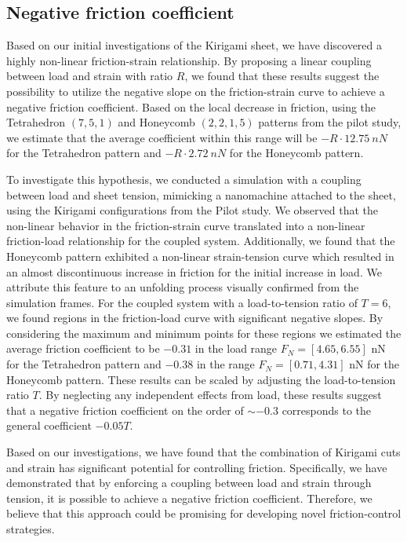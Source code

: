 \subsection{Negative friction coefficient}
Based on our initial investigations of the Kirigami sheet, we have discovered a
highly non-linear friction-strain relationship. By proposing a linear coupling
between load and strain with ratio $R$, we found that these results suggest the
possibility to utilize the negative slope on the friction-strain curve to
achieve a negative friction coefficient. Based on the local decrease in friction, using the Tetrahedron $(7,5,1)$ and Honeycomb $(2,2,1,5)$ patterns
from the pilot study, we estimate that the average coefficient within this range
will be $-R\cdot\SI{12.75}{nN}$ for the Tetrahedron pattern and
$-R\cdot\SI{2.72}{nN}$ for the Honeycomb pattern.

To investigate this hypothesis, we conducted a simulation with a coupling
between load and sheet tension, mimicking a nanomachine attached to the sheet,
using the Kirigami configurations from the Pilot study. We observed that the non-linear behavior in the friction-strain curve translated into a non-linear friction-load relationship for the coupled system. Additionally, we found that the Honeycomb pattern exhibited a non-linear strain-tension curve which resulted in an almost discontinuous increase in friction for the initial
increase in load. We attribute this feature to an unfolding process visually
confirmed from the simulation frames. For the coupled system with a
load-to-tension ratio of $T=6$, we found regions in the friction-load curve with
significant negative slopes. By considering the maximum and minimum points for
these regions we estimated the average friction coefficient to be $-0.31$ in the
load range $F_N = [4.65, 6.55]$ nN for the Tetrahedron pattern and $-0.38$ in the
range $F_N = [0.71, 4.31]$ nN for the Honeycomb pattern. These results can be scaled by adjusting the load-to-tension ratio $T$. By neglecting any independent effects from load, these results suggest that a negative friction coefficient on the order of $\sim -0.3$ corresponds to the general coefficient $-0.05 T$.

Based on our investigations, we have found that the combination of Kirigami cuts and strain has significant potential for controlling friction. Specifically, we have demonstrated that by enforcing a coupling between load and strain through tension, it is possible to achieve a negative friction coefficient. Therefore, we believe that this approach could be promising for developing novel friction-control strategies.


